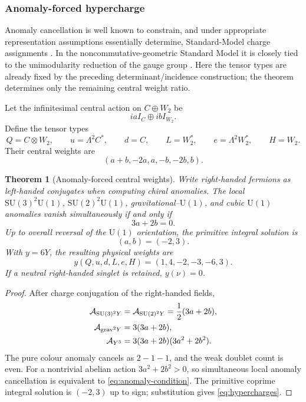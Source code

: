 \documentclass[11pt]{article}
\newtheorem{theorem}{Theorem}[section]
\theoremstyle{definition}
\theoremstyle{remark}
\newcommand{\U}{\mathrm U}
\newcommand{\SU}{\mathrm{SU}}
\begin{document}
\subsubsection{Anomaly-forced hypercharge}

Anomaly cancellation is well known to constrain, and under appropriate
representation assumptions essentially determine, Standard-Model charge
assignments \cite{GengMarshak1989,MinahanRamondWarner1990}.  In the
noncommutative-geometric Standard Model it is closely tied to the
unimodularity reduction of the gauge group
\cite{AlvarezGraciaBondiaMartin1995}.  Here the tensor types are already fixed
by the preceding determinant/incidence construction; the theorem determines
only the remaining central weight ratio.

Let the infinitesimal central action on $C\oplus W_2$ be
\[
iaI_C\oplus ibI_{W_2}.
\]
Define the tensor types
\begin{equation}
Q=C\otimes W_2,\qquad
u=\Lambda^2C^*,\qquad
d=C,\qquad
L=W_2^*,\qquad
e=\Lambda^2W_2^*,\qquad
H=W_2.
\label{eq:SM-types}
\end{equation}
Their central weights are
\begin{equation}
(a+b,-2a,a,-b,-2b,b).
\label{eq:central-weights}
\end{equation}

\begin{theorem}[Anomaly-forced central weights]
\label{thm:hypercharge}
Write right-handed fermions as left-handed conjugates when computing chiral
anomalies.  The local
$\SU(3)^2\U(1)$,
$\SU(2)^2\U(1)$,
gravitational--$\U(1)$,
and cubic $\U(1)$ anomalies vanish simultaneously if and only if
\begin{equation}
\boxed{3a+2b=0.}
\label{eq:anomaly-condition}
\end{equation}
Up to overall reversal of the $\U(1)$ orientation, the primitive integral
solution is
\[
(a,b)=(-2,3).
\]
With $y=6Y$, the resulting physical weights are
\begin{equation}
\boxed{
y(Q,u,d,L,e,H)=(1,4,-2,-3,-6,3).}
\label{eq:hypercharges}
\end{equation}
If a neutral right-handed singlet is retained, $y(\nu)=0$.
\end{theorem}

\begin{proof}
After charge conjugation of the right-handed fields,
\begin{align*}
\mathcal A_{\SU(3)^2Y}
&=
\mathcal A_{\SU(2)^2Y}
=
\frac12(3a+2b),\\
\mathcal A_{{\rm grav}^2Y}
&=
3(3a+2b),\\
\mathcal A_{Y^3}
&=
3(3a+2b)(3a^2+2b^2).
\end{align*}
The pure colour anomaly cancels as $2-1-1$, and the weak doublet count is even.
For a nontrivial abelian action $3a^2+2b^2>0$, so simultaneous local anomaly
cancellation is equivalent to \eqref{eq:anomaly-condition}.  The primitive
coprime integral solution is $(-2,3)$ up to sign; substitution gives
\eqref{eq:hypercharges}.
\end{proof}
\end{document}
